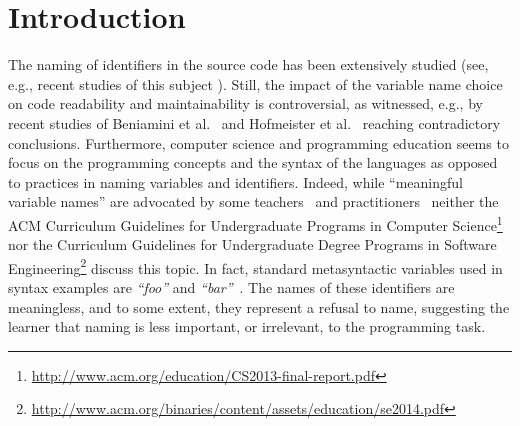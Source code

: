 \documentclass[conference]{IEEEtran}
\newcommand{\todo}[1]{ \textbf{#1} }
\newcommand{\quotes}[1]{\textit{``#1''}}
\begin{document}
\IEEEpeerreviewmaketitle

\section{Introduction}
The naming of identifiers in the source code has been extensively studied (see, e.g., recent studies of this subject \cite{AmanASK15,AvidanF17,Beniamini,ButlerWYS10,HofmeisterSH17,LunguK13,ScannielloR13,TramontanaRS14}).
Still, the impact of the variable name choice on code readability and maintainability is controversial, as witnessed, e.g., by recent studies of Beniamini et al.~\cite{Beniamini} and Hofmeister et al.~\cite{HofmeisterSH17} reaching contradictory conclusions.
%
Furthermore, computer science and programming education seems to focus on the programming concepts and the syntax of the languages as opposed to practices in naming variables and identifiers. 
Indeed, while ``meaningful variable names'' are advocated by some teachers~\cite{Kato2016} and practitioners~\cite{Rother} neither the ACM Curriculum Guidelines for Undergraduate Programs in Computer Science\footnote{\url{http://www.acm.org/education/CS2013-final-report.pdf}} nor the Curriculum Guidelines for Undergraduate Degree Programs in Software Engineering\footnote{\url{http://www.acm.org/binaries/content/assets/education/se2014.pdf}} discuss this topic.
In fact, standard metasyntactic variables used in syntax examples are \quotes{foo} and \quotes{bar}~\cite{Raymond}.
The names of these identifiers are meaningless, and to some extent, they represent a refusal to name, suggesting the learner that naming is less important, or irrelevant, to the programming task. 

\end{document}
